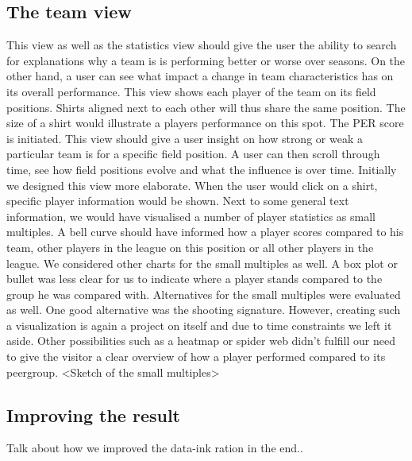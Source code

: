 \documentclass{sigchi}
\begin{document}
\subsection{The team view}
This view as well as the statistics view should give the user the ability to search
for explanations why a team is is performing better or worse over seasons. On the 
other hand, a user can see what impact a change in team characteristics has on its
overall performance.
This view shows each player of the team on its field positions. Shirts aligned next to 
each other will thus share the same position. The size of a shirt would illustrate a players performance on this spot. The PER score is initiated. This view should give
a user insight on how strong or weak a particular team is for a specific field position.
A user can then scroll through time, see how field positions evolve and what the influence
is over time.
Initially we designed this view more elaborate. When the user would click on a shirt,
specific player information would be shown. Next to some general text information, 
we would have visualised a number of player statistics as small multiples. A bell curve
should have informed how a player scores compared to his team, other players in the 
league on this position or all other players in the league. We considered other charts for
the small multiples as well. A box plot or bullet was less clear for us to indicate where
a player stands compared to the group he was compared with. Alternatives for the small 
multiples were evaluated as well. One good alternative was the shooting signature.\cite{peterbeshai}
However, creating such a visualization is again a project on itself and due to time 
constraints we left it aside. Other possibilities such as a heatmap or spider web didn't
fulfill our need to give the visitor a clear overview of how a player performed compared
to its peergroup.
<Sketch of the small multiples>

\subsection{Improving the result}
Talk about how we improved the data-ink ration in the end..
\end{document}
